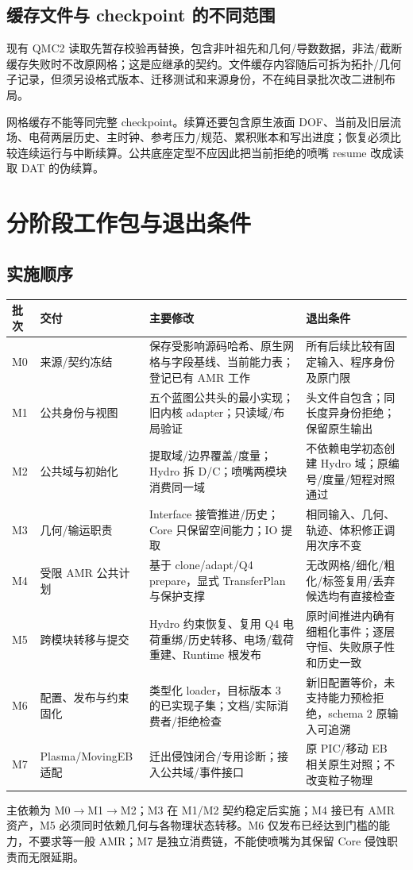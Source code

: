 \documentclass[UTF8,a4paper,11pt,fontset=fandol]{ctexart}
\begin{document}
\subsection{缓存文件与 checkpoint 的不同范围}
现有 QMC2 读取先暂存校验再替换，包含非叶祖先和几何/导数数据，非法/截断缓存失败时不改原网格；这是应继承的契约。文件缓存内容随后可拆为拓扑/几何子记录，但须另设格式版本、迁移测试和来源身份，不在纯目录批次改二进制布局。

网格缓存不能等同完整 checkpoint。续算还要包含原生液面 DOF、当前及旧层流场、电荷两层历史、主时钟、参考压力/规范、累积账本和写出进度；恢复必须比较连续运行与中断续算。公共底座定型不应因此把当前拒绝的喷嘴 resume 改成读取 DAT 的伪续算。

\section{分阶段工作包与退出条件}
\subsection{实施顺序}
\begin{longtable}{@{}P{.09\textwidth}P{.25\textwidth}P{.37\textwidth}P{.23\textwidth}@{}}
\toprule 批次 & 交付 & 主要修改 & 退出条件\\\midrule\endhead
M0 & 来源/契约冻结 & 保存受影响源码哈希、原生网格与字段基线、当前能力表；登记已有 AMR 工作 & 所有后续比较有固定输入、程序身份及原门限\\
M1 & 公共身份与视图 & 五个蓝图公共头的最小实现；旧内核 adapter；只读域/布局验证 & 头文件自包含；同长度异身份拒绝；保留原生输出\\
M2 & 公共域与初始化 & 提取域/边界覆盖/度量；Hydro 拆 D/C；喷嘴两模块消费同一域 & 不依赖电学初态创建 Hydro 域；原编号/度量/短程对照通过\\
M3 & 几何/输运职责 & Interface 接管推进/历史；Core 只保留空间能力；IO 提取 & 相同输入、几何、轨迹、体积修正调用次序不变\\
M4 & 受限 AMR 公共计划 & 基于 clone/adapt/Q4 prepare，显式 TransferPlan 与保护支撑 & 无改网格/细化/粗化/标签复用/丢弃候选均有直接检查\\
M5 & 跨模块转移与提交 & Hydro 约束恢复、复用 Q4 电荷重绑/历史转移、电场/载荷重建、Runtime 根发布 & 原时间推进内确有细粗化事件；逐层守恒、失败原子性和历史一致\\
M6 & 配置、发布与约束固化 & 类型化 loader，目标版本 3 的已实现子集；文档/实际消费者/拒绝检查 & 新旧配置等价，未支持能力预检拒绝，schema 2 原输入可追溯\\
M7 & Plasma/MovingEB 适配 & 迁出侵蚀闭合/专用诊断；接入公共域/事件接口 & 原 PIC/移动 EB 相关原生对照；不改变粒子物理\\
\bottomrule
\end{longtable}
主依赖为 M0$\to$M1$\to$M2；M3 在 M1/M2 契约稳定后实施；M4 接已有 AMR 资产，M5 必须同时依赖几何与各物理状态转移。M6 仅发布已经达到门槛的能力，不要求等一般 AMR；M7 是独立消费链，不能使喷嘴为其保留 Core 侵蚀职责而无限延期。
\end{document}

